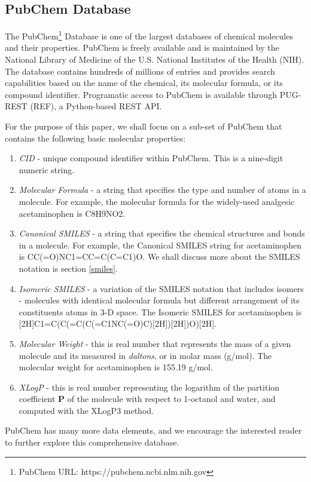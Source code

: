 \subsection{PubChem Database}
The PubChem\footnote{PubChem URL: https://pubchem.ncbi.nlm.nih.gov} Database is one of the largest databases of chemical molecules and their properties. PubChem is freely available and is maintained by the National Library of  Medicine of the U.S. National Institutes of the Health (NIH). The database contains hundreds of millions of entries and provides search capabilities based on the name of the chemical, its molecular formula, or its compound identifier.  Programatic access to  PubChem is available through PUG-REST (REF), a Python-based REST API. 

For the purpose of this paper, we shall focus on a sub-set of PubChem that contains the following basic molecular properties:
\begin{enumerate}
	\item {\em CID} - unique compound identifier within PubChem. This is a nine-digit numeric string. 
	\item {\em Molecular Formula} -  a string that specifies the type and number of atoms in a molecule. For example, the molecular formula for the widely-used analgesic acetaminophen is C8H9NO2.
	\item {\em Canonical SMILES} - a string that specifies the chemical structures and bonds in a molecule. For example, the Canonical SMILES string for acetaminophen is CC(=O)NC1=CC=C(C=C1)O. We shall discuss more about the SMILES notation is section \ref{smiles}.
	\item {\em Isomeric SMILES} - a variation of the SMILES notation that includes isomers - molecules with identical molecular formula but different arrangement of its constituents atoms in 3-D space. The Isomeric SMILES for acetaminophen is [2H]C1=C(C(=C(C(=C1NC(=O)C)[2H])[2H])O)[2H].
	\item {\em Molecular Weight} - this is real number that represents the mass of a given molecule and its measured in {\em daltons}, or in molar mass (g/mol). The molecular weight for acetaminophen is 155.19 g/mol.
	\item {\em XLogP} - this is real number representing the logarithm of the partition coefficient $\boldsymbol P$ of the molecule with respect to 1-octanol and water, and computed with the XLogP3 method. 
\end{enumerate}
PubChem has many more data elements, and we encourage the interested reader to further explore this comprehensive database. 

